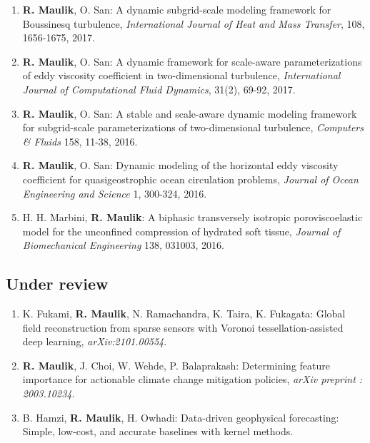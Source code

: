 \documentclass[letterpaper]{article}
\begin{document}
\begin{enumerate}
\item \textbf{R. Maulik}, O. San: A dynamic subgrid-scale modeling framework for Boussinesq turbulence, {\it International Journal of Heat and Mass Transfer}, 108, 1656-1675, 2017. 

\item \textbf{R. Maulik}, O. San: A dynamic framework for scale-aware parameterizations of eddy viscosity coefficient in two-dimensional turbulence, {\it International Journal of Computational Fluid Dynamics}, 31(2), 69-92, 2017. 

\item \textbf{R. Maulik}, O. San: A stable and scale-aware dynamic modeling framework for subgrid-scale parameterizations of two-dimensional turbulence, {\it Computers \& Fluids} 158, 11-38, 2016. 

\item \textbf{R. Maulik}, O. San: Dynamic modeling of the horizontal eddy viscosity coefficient for quasigeostrophic ocean circulation problems, {\it Journal of Ocean Engineering and Science} 1, 300-324, 2016.

\item H. H. Marbini, \textbf{R. Maulik}: A biphasic transversely isotropic poroviscoelastic model for the unconfined compression of hydrated soft tissue, {\it Journal of Biomechanical Engineering} 138, 031003, 2016.

\end{enumerate}

\subsection*{Under review}

\begin{enumerate}

\item K. Fukami, \textbf{R. Maulik}, N. Ramachandra, K. Taira, K. Fukagata: Global field reconstruction from sparse sensors with Voronoi tessellation-assisted deep learning, {\it arXiv:2101.00554}.

\item \textbf{R. Maulik}, J. Choi,  W. Wehde, P. Balaprakash: Determining feature importance for actionable climate change mitigation policies, {\it arXiv preprint : 2003.10234}.

\item B. Hamzi, \textbf{R. Maulik}, H. Owhadi: Data-driven geophysical forecasting: Simple, low-cost, and accurate baselines with kernel methods.

\end{enumerate}
\end{document}
